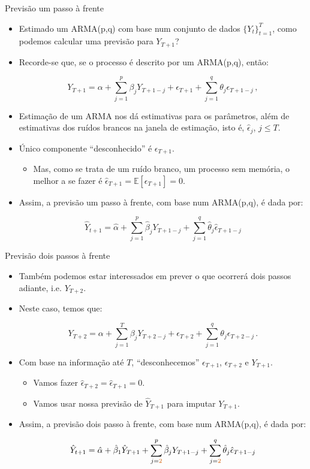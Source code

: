 \documentclass[11pt]{beamer}
\begin{document}
\begin{frame}{Previsão um passo à frente}
	\begin{itemize}
		\item Estimado um ARMA(p,q) com base num conjunto de dados $\{Y_t\}_{t=1}^T$, como podemos calcular uma previsão para $Y_{T+1}$?
		\item Recorde-se que, se o processo é descrito por um ARMA(p,q), então:
		
		$$Y_{T+1} = \alpha + \sum_{j=1}^{p} \beta_j Y_{T+1-j} + \epsilon_{T+1} + \sum_{j=1}^q \theta_j \epsilon_{T+1-j} \, ,  $$
		
		\item Estimação de um ARMA nos dá estimativas para os parâmetros, além de estimativas dos ruídos brancos na janela de estimação, isto é, $\hat \epsilon_{j}$, $j \leq T$.
		\item Único componente ``desconhecido'' é $\epsilon_{T+1}$.
		\begin{itemize}
				\item Mas, como se trata de um ruído branco, um processo sem memória, o melhor a se fazer é $\hat \epsilon_{T+1} = \mathbb{E}[\epsilon_{T+1}] = 0$.
		\end{itemize}
		\item Assim, {\color{blue}a previsão um passo à frente}, com base num ARMA(p,q), é dada por:
		
		$$\hat Y_{t+1} = \hat \alpha + \sum_{j=1}^p \hat{\beta}_j Y_{T+1-j} + \sum_{j=1}^q \hat \theta_j \hat \epsilon_{T+1-j}$$
	
	\end{itemize}
\end{frame}

\begin{frame}{Previsão dois passos à frente}
	\begin{itemize}
		\item Também podemos estar interessados em prever o que ocorrerá dois passos adiante, i.e. $Y_{T+2}$.
		\item Neste caso, temos que:
		
		$$Y_{T+2} = \alpha + \sum_{j=1}^T \beta_{j} 	Y_{T+2-j} + \epsilon_{T+2} + \sum_{j=1}^q \theta_j \epsilon_{T+2-j}\, .$$
		
		\item Com base na informação até $T$, ``desconhecemos'' $\epsilon_{T+1}$, $\epsilon_{T+2}$ e $Y_{T+1}$.
		\begin{itemize}
			\item Vamos fazer $\hat \epsilon_{T+2} = \hat \epsilon_{T+1} = 0$.
			\item Vamos usar nossa previsão de $\hat{Y}_{T+1}$ para imputar $Y_{T+1}$.
		\end{itemize}
			\item Assim, {\color{blue}a previsão dois passo à frente}, com base num ARMA(p,q), é dada por:
		
		$$\hat Y_{t+1} = \hat \alpha + \hat \beta_1 \hat Y_{T+1} + \sum_{j={\color{red}2}}^p \hat{\beta}_j Y_{T+1-j} + \sum_{j={\color{red}2}}^q \hat \theta_j \hat\epsilon_{T+1-j}$$
	\end{itemize}
\end{frame}
\end{document}
